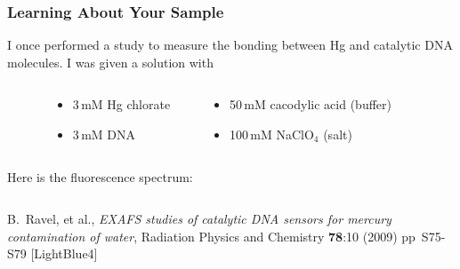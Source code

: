 \documentclass[10pt, xcolor=x11names, compress]{beamer}
\begin{document}
\begin{frame}
  \frametitle{Learning About Your Sample}
  I once performed a study to measure the bonding between Hg and
  catalytic DNA molecules.  I was given a solution with
  \begin{columns}[T]
    \begin{column}{0.125\linewidth}
      ~
    \end{column}
    \begin{column}{0.3\linewidth}
      \begin{itemize}
      \item 3\,mM Hg chlorate
      \item 3\,mM DNA
      \end{itemize}
    \end{column}
    \begin{column}{0.45\linewidth}
      \begin{itemize}
      \item 50\,mM cacodylic acid (buffer)
      \item 100\,mM NaClO$_4$ (salt)
      \end{itemize}
    \end{column}
    \begin{column}{0.125\linewidth}
      ~
    \end{column}
  \end{columns}

  \medskip

  Here is the fluorescence spectrum:\\[1ex]
  \begin{columns}
    \begin{column}{0.5\linewidth}
    \end{column}
    \begin{column}{0.5\linewidth}
      \begin{center}
      \end{center}
    \end{column}
  \end{columns}
  \begin{bottomnote}[0.5][19]
    B.\ Ravel, et al., \textit{EXAFS studies of catalytic DNA sensors
      for mercury contamination of water}, Radiation Physics and
    Chemistry \textbf{78}:10 (2009) pp\ S75-S79
    [LightBlue4]
  \end{bottomnote}
\end{frame}
\end{document}
